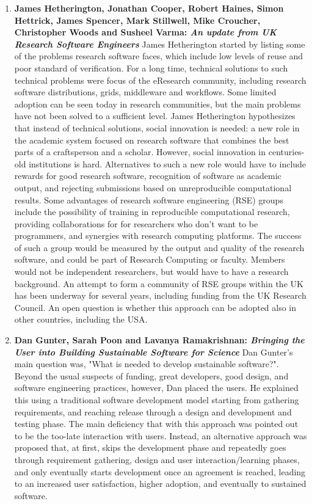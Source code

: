 \documentclass[11pt, oneside]{amsart}
\begin{document}
\begin{enumerate}
\item \textbf{James Hetherington, Jonathan Cooper, Robert Haines, Simon
Hettrick, James Spencer, Mark Stillwell, Mike Croucher, Christopher Woods and
Susheel Varma: \textit{An update from UK Research Software Engineers}}
James Hetherington started by listing some of the problems research software
faces, which include low levels of reuse and poor standard of verification. For
a long time, technical solutions to such technical problems were focus of the
eResearch community, including research software distributions, grids,
middleware and workflows. Some limited adoption can be seen today in research
communities, but the main problems have not been solved to a sufficient level.
James Hetherington hypothesizes that instead of technical solutions, social
innovation is needed: a new role in the academic system focused on research
software that combines the best parts of a craftsperson and a scholar. However,
social innovation in centuries-old institutions is hard. Alternatives to such a
new role would have to include rewards for good research software, recognition
of software as academic output, and rejecting submissions based on
unreproducible computational results. Some advantages of research software
engineering (RSE) groups include the possibility of training in reproducible
computational research, providing collaborations for for researchers who don't
want to be programmers, and synergies with research computing platforms. The
success of such a group would be measured by the output and quality of the
research software, and could be part of Research Computing or faculty. Members
would not be independent researchers, but would have to have a research
background. An attempt to form a community of RSE groups within the UK has been
underway for several years, including funding from the UK Research Council. An
open question is whether this approach can be adopted also in other countries,
including the USA.

\item \textbf{Dan Gunter, Sarah Poon and Lavanya Ramakrishnan: \textit{Bringing the
User into Building Sustainable Software for Science}}
Dan Gunter's main question was, "What is needed to develop sustainable software?".
Beyond the usual suspects of funding, great developers, good
design, and software engineering practices, however, Dan placed the
users. He explained this using a traditional software development model starting
from gathering requirements, and reaching release through a design and
development and testing phase. The main deficiency that with this approach was
pointed out to be the too-late interaction with users. Instead, an alternative
approach was proposed that, at first, skips the development phase and repeatedly
goes through requirement gathering, design and user interaction/learning
phases, and only eventually starts development once an agreement is reached,
leading to an increased user satisfaction, higher adoption, and eventually to
sustained software.


\end{enumerate}
\end{document}
